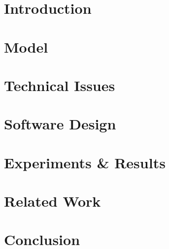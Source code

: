 \chapter{Introduction}
  
\chapter{Model}

\chapter{Technical Issues}

\chapter{Software Design}

\chapter{Experiments \& Results}

\chapter{Related Work}

\chapter{Conclusion}